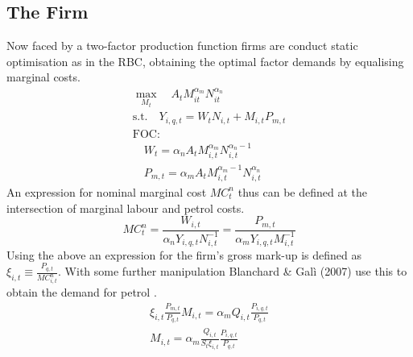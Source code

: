 \documentclass[12pt,a4paper,english]{article} %
\begin{document}
	\subsection{The Firm}
	Now faced by a two-factor production function firms are conduct static optimisation as in the RBC, obtaining the optimal factor demands by equalising marginal costs.  
	\begin{equation}
		\begin{aligned}
			\max_{M_t} \quad A_t M_{it}^{\alpha_m} N_{it}^{\alpha_n} \\
			\textrm{s.t.} \quad Y_{i,q,t} = W_t N_{i,t} + M_{i,t} P_{m,t}\\
			\textrm{FOC:} \\
			\quad W_{t} = \alpha_n A_t M_{i,t}^{\alpha_m} N_{i,t}^{\alpha_n -1}\\
			\quad P_{m,t} = \alpha_m A_t M_{i,t}^{\alpha_m -1} N_{i,t}^{\alpha_n}
		\end{aligned}
	\end{equation}
	An expression for nominal marginal cost $MC_t^n$ thus can be defined at the intersection of marginal labour and petrol costs. 
	\begin{equation}
		MC_t^n = \frac{W_{i,t}}{\alpha_n Y_{i,q,t} N_{i,t}^{-1}} = \frac{P_{m,t}}{\alpha_m Y_{i,q,t} M_{i,t}^{-1}}
	\end{equation}
	Using the above an expression for the firm's gross mark-up is defined as $\xi_{i,t} \equiv \frac{P_{q,t}}{MC_{i,t}^n}$. With some further manipulation Blanchard \& Galì (2007) use this to obtain the demand for petrol \cite{blanchard_macroeconomic_2007}.
	\begin{equation}
		\begin{aligned}
		\xi_{i,t} \frac{P_{m,t}}{P_{q,t}} M_{i,t} = \alpha_m Q_{i,t} \frac{P_{i,q,t}}{P_{q,t}} \\
		M_{i,t} = \alpha_m \frac{Q_{i,t}}{S_t \xi_{i,t}} \frac{P_{i,q,t}}{P_{q,t}}
	\end{aligned}
	\end{equation}
\end{document}
